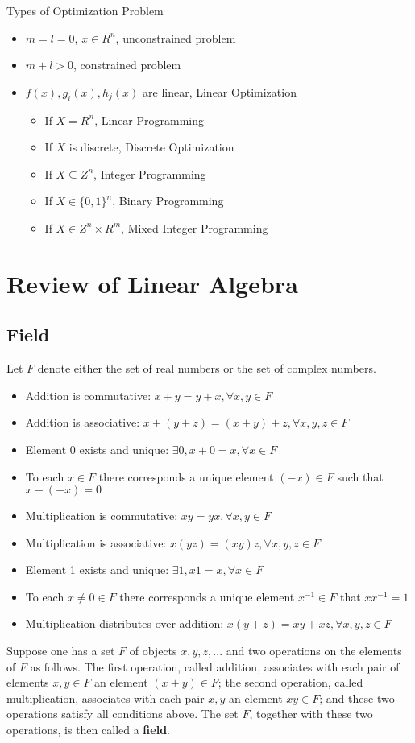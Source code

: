 			Types of Optimization Problem
			\begin{itemize}
				\item $m = l = 0$, $x \in R^n$, unconstrained problem
				\item $m + l > 0$, constrained problem
				\item $f(x), g_i(x), h_j(x)$ are linear, Linear Optimization
				\begin{itemize}
					\item If $X=R^n$, Linear Programming
					\item If $X$ is discrete,  Discrete Optimization
					\item If $X \subseteq Z^n$, Integer Programming
					\item If $X\in \{0,1\}^n$, Binary Programming
					\item If $X\in Z^n \times R^m$, Mixed Integer Programming
				\end{itemize}
			\end{itemize}

	\chapter{Review of Linear Algebra}
		\section{Field}
			\begin{definition}[Field]
				Let $F$ denote either the set  of real numbers or the set of complex numbers.
				\begin{itemize}
					\item Addition is commutative: $x + y = y + x, \forall x, y \in F$
					\item Addition is associative: $x + (y + z) = (x + y) + z, \forall x, y, z \in F$
					\item Element 0 exists and unique: $\exists 0, x + 0 = x, \forall x \in F$
					\item To each $x \in F$ there corresponds a unique element $(-x) \in F$ such that $x + (-x) = 0$
					\item Multiplication is commutative: $xy = yx, \forall x, y \in F$
					\item Multiplication is associative: $x(yz) = (xy)z, \forall x, y, z \in F$
					\item Element 1 exists and unique: $\exists 1, x1=x, \forall x \in F$
					\item To each $x\neq 0 \in F$ there corresponds a unique element $x^{-1} \in F$ that $xx^{-1} = 1$
					\item Multiplication distributes over addition: $x(y + z) = xy + xz, \forall x, y, z \in F$
				\end{itemize}
				Suppose one has a set $F$ of objects $x, y, z, ...$ and two operations on the elements of $F$ as follows. The first operation, called addition, associates with each pair of elements $x, y \in F$ an element $(x + y)\in F$; the second operation, called multiplication, associates with each pair $x, y$ an element $xy \in F$; and these two operations satisfy all conditions above. The set $F$, together with these two operations, is then called a \textbf{field}.
			\end{definition}


